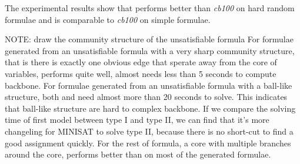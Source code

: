 The experimental results show that \tool performs better than \textit{cb100} on hard random formulae and is comparable to \textit{cb100} on simple formulae.

NOTE: draw the community structure of the unsatisfiable formula
For formulae generated from an unsatisfiable formula with a very sharp community structure, that is there is exactly one obvious edge that sperate away from the core of variables, \tool performs quite well, almost needs less than 5 seconds to compute backbone.
For formulae generated from an unsatisfiable formula with a ball-like structure, both \tool and \minibones need almost more than 20 seconds to solve. This indicates that ball-like structure are hard to complex backbone. If we compare the solving time of first model between type I and type II, we can find that it's more changeling for MINISAT to solve type II, because there is no short-cut to find a good assignment quickly.
For the rest of formula, a core with multiple branches around the core, \tool performs better than \minibones on most of the generated formulae.


